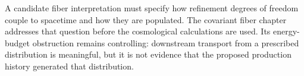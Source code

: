 A candidate fiber interpretation must specify how refinement degrees of freedom couple to spacetime and how they are populated. The covariant fiber chapter addresses that question before the cosmological calculations are used. Its energy-budget obstruction remains controlling: downstream transport from a prescribed distribution is meaningful, but it is not evidence that the proposed production history generated that distribution.
